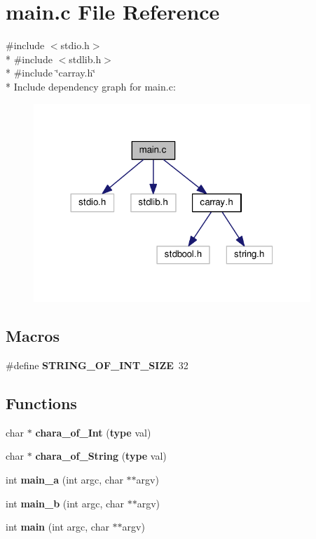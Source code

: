 \section{main.\+c File Reference}
\label{main_8c}
{\ttfamily \#include $<$stdio.\+h$>$}\\*
{\ttfamily \#include $<$stdlib.\+h$>$}\\*
{\ttfamily \#include \char`\"{}carray.\+h\char`\"{}}\\*
Include dependency graph for main.\+c\+:
\nopagebreak
\begin{figure}[H]
\begin{center}
\leavevmode
\includegraphics[width=296pt]{main_8c__incl}
\end{center}
\end{figure}
\subsection*{Macros}
\begin{DoxyCompactItemize}
\item 
\#define {\bf S\+T\+R\+I\+N\+G\+\_\+\+O\+F\+\_\+\+I\+N\+T\+\_\+\+S\+I\+ZE}~32
\end{DoxyCompactItemize}
\subsection*{Functions}
\begin{DoxyCompactItemize}
\item 
char $\ast$ {\bf chara\+\_\+of\+\_\+\+Int} ({\bf type} val)
\item 
char $\ast$ {\bf chara\+\_\+of\+\_\+\+String} ({\bf type} val)
\item 
int {\bf main\+\_\+a} (int argc, char $\ast$$\ast$argv)
\item 
int {\bf main\+\_\+b} (int argc, char $\ast$$\ast$argv)
\item 
int {\bf main} (int argc, char $\ast$$\ast$argv)
\end{DoxyCompactItemize}


